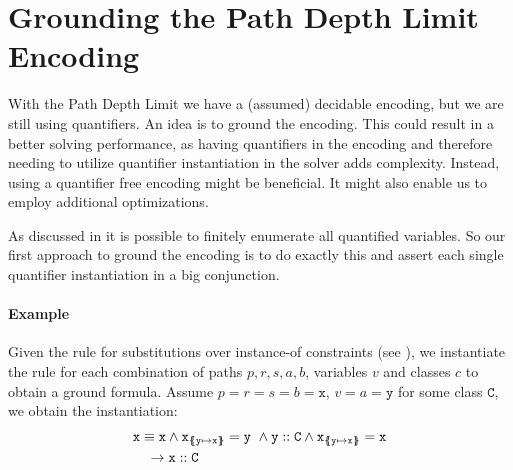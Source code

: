 \documentclass[a4paper]{article}
\begin{document}
\section{Grounding the Path Depth Limit Encoding}
With the Path Depth Limit we have a (assumed) decidable encoding,
but we are still using quantifiers.
An idea is to ground the encoding.
This could result in a better solving performance,
as having quantifiers in the encoding
and therefore needing to utilize quantifier instantiation
in the solver adds complexity.
Instead, using a quantifier free encoding might be beneficial.
It might also enable us to employ additional optimizations.

As discussed in  it is possible
to finitely enumerate all quantified variables.
So our first approach to ground the encoding is to do exactly this
and assert each single quantifier instantiation in a big conjunction.

\paragraph{Example}
\label{ex:smt-ground-instantiation}
Given the rule for substitutions over instance-of constraints
(see ),
we instantiate the rule for each combination of paths $p,r,s,a,b$,
variables $v$ and classes $c$ to obtain a ground formula.
Assume $p=r=s=b=\mathtt{x}$, $v=a=\mathtt{y}$ for some class $\mathtt{C}$,
we obtain the instantiation:
%
\begin{align*}
  &\mathit{\mathtt{x}} \equiv \mathit{\mathtt{x}} \land \mathtt{x}_{\{\mskip-6.9mu\{ \mathtt{y} \mapsto \mathtt{x} \}\mskip-6.9mu\}}=\mathtt{y}~\land
  \mathit{\mathtt{y}} :: \mathit{\mathtt{C}} \land \mathtt{x}_{\{\mskip-6.9mu\{ \mathtt{y} \mapsto \mathtt{x} \}\mskip-6.9mu\}}=\mathtt{x}\\
  &\quad \rightarrow \mathit{\mathtt{x}} :: \mathit{\mathtt{C}}
\end{align*}
\end{document}
